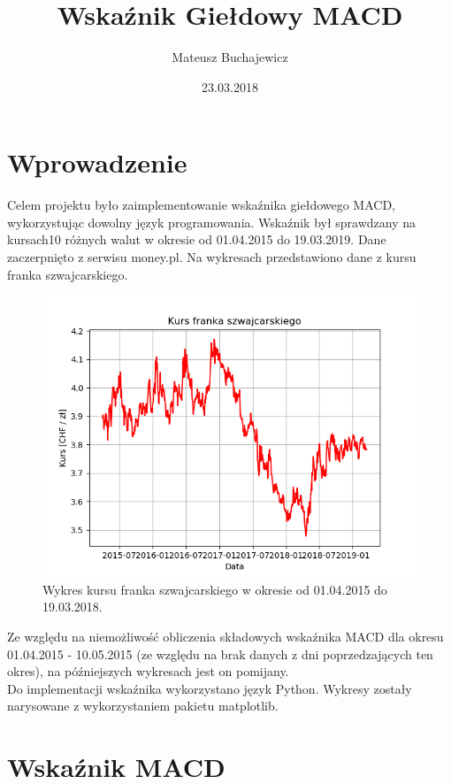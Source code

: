 \documentclass{article} %
\title{Wskaźnik Giełdowy MACD}
\date{23.03.2018}
\author{Mateusz Buchajewicz}
\begin{document}
\maketitle
\section{Wprowadzenie}
Celem projektu było zaimplementowanie wskaźnika giełdowego MACD, wykorzystując dowolny język programowania.
Wskaźnik był sprawdzany na kursach10 różnych walut w okresie od 01.04.2015 do 19.03.2019. 
Dane zaczerpnięto z serwisu money.pl. Na wykresach przedstawiono dane z kursu franka szwajcarskiego. \\

\begin{figure}[h]
    \centering
    \includegraphics[scale=0.7]{wykres_kursu}
    \caption{Wykres kursu franka szwajcarskiego w okresie od 01.04.2015 do 19.03.2018.}
\end{figure} 

Ze względu na niemożliwość obliczenia składowych wskaźnika MACD dla okresu 01.04.2015 - 10.05.2015
(ze względu na brak danych z dni poprzedzających ten okres), na późniejszych wykresach jest on pomijany. \\

Do implementacji wskaźnika wykorzystano język Python. Wykresy zostały narysowane z wykorzystaniem pakietu matplotlib.




\newpage

\section{Wskaźnik MACD}
\end{document}
